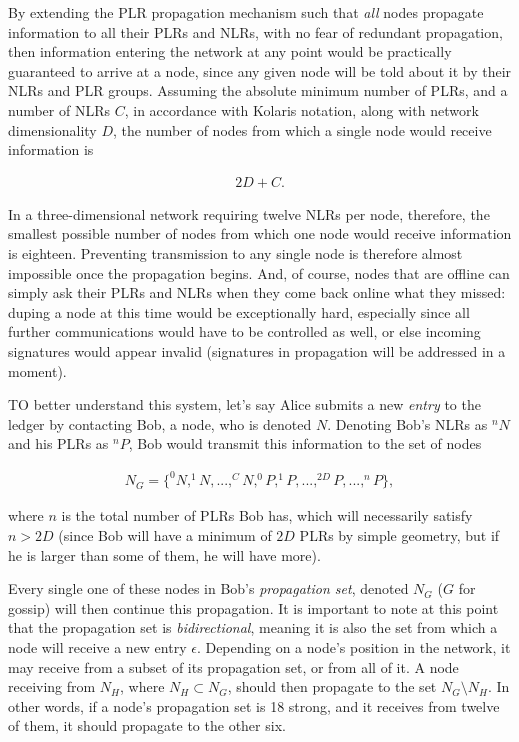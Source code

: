 \documentclass{extreport}
\begin{document}
By extending the PLR propagation mechanism such that \emph{all} nodes propagate information to all their PLRs and NLRs, with no fear of redundant propagation, then information entering the network at any point would be practically guaranteed to arrive at a node, since any given node will be told about it by their NLRs and PLR groups. Assuming the absolute minimum number of PLRs, and a number of NLRs \(C\), in accordance with Kolaris notation, along with network dimensionality \(D\), the number of nodes from which a single node would receive information is

\begin{align*}
2D + C. \tag{2.1}
\end{align*}

In a three-dimensional network requiring twelve NLRs per node, therefore, the smallest possible number of nodes from which one node would receive information is eighteen. Preventing transmission to any single node is therefore almost impossible once the propagation begins. And, of course, nodes that are offline can simply ask their PLRs and NLRs when they come back online what they missed: duping a node at this time would be exceptionally hard, especially since all further communications would have to be controlled as well, or else incoming signatures would appear invalid (signatures in propagation will be addressed in a moment).

TO better understand this system, let's say Alice submits a new \emph{entry} to the ledger by contacting Bob, a node, who is denoted \(N\). Denoting Bob's NLRs as \(^nN\) and his PLRs as \(^nP\), Bob would transmit this information to the set of nodes

\begin{align*}
N_G = \{ ^0N, ^1N, ..., ^CN, ^0P, ^1P, ..., ^{2D}P, ..., ^nP \}, \tag{2.2}
\end{align*}

where \(n\) is the total number of PLRs Bob has, which will necessarily satisfy \(n > 2D\) (since Bob will have a minimum of \(2D\) PLRs by simple geometry, but if he is larger than some of them, he will have more).

Every single one of these nodes in Bob's \emph{propagation set}, denoted \(N_G\) (\(G\) for gossip) will then continue this propagation. It is important to note at this point that the propagation set is \emph{bidirectional}, meaning it is also the set from which a node will receive a new entry \(\epsilon\). Depending on a node's position in the network, it may receive from a subset of its propagation set, or from all of it. A node receiving from \(N_H\), where \(N_H \subset N_G\), should then propagate to the set \(N_G \setminus N_H\). In other words, if a node's propagation set is 18 strong, and it receives from twelve of them, it should propagate to the other six.
\end{document}

